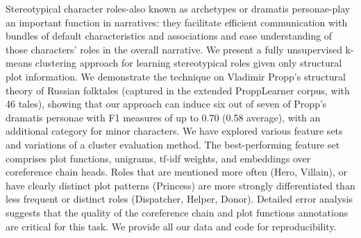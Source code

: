 Stereotypical character roles-also known as archetypes or dramatis personae-play an important function in narratives: they facilitate efficient communication with bundles of default characteristics and associations and ease understanding of those characters' roles in the overall narrative. We present a fully unsupervised k-means clustering approach for learning stereotypical roles given only structural plot information. We demonstrate the technique on Vladimir Propp's structural theory of Russian folktales (captured in the extended ProppLearner corpus, with 46 tales), showing that our approach can induce six out of seven of Propp's dramatis personae with F1 measures of up to 0.70 (0.58 average), with an additional category for minor characters. We have explored various feature sets and variations of a cluster evaluation method. The best-performing feature set comprises plot functions, unigrams, tf-idf weights, and embeddings over coreference chain heads. Roles that are mentioned more often (Hero, Villain), or have clearly distinct plot patterns (Princess) are more strongly differentiated than less frequent or distinct roles (Dispatcher, Helper, Donor). Detailed error analysis suggests that the quality of the coreference chain and plot functions annotations are critical for this task. We provide all our data and code for reproducibility.
